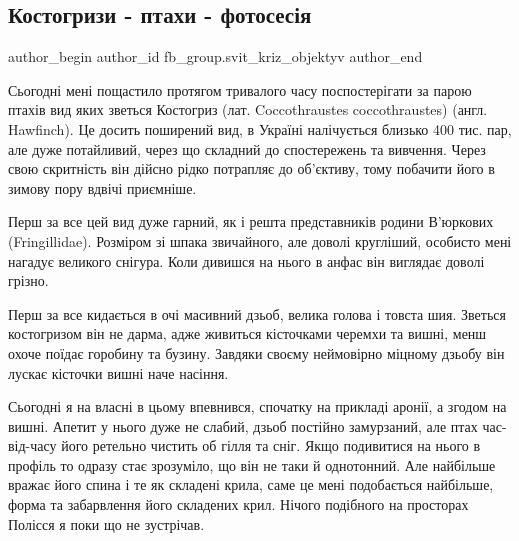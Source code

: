 
 
 
 
 
 
\subsection{Костогризи - птахи - фотосесія}
\label{sec:24_01_2022.fb.fb_group.svit_kriz_objektyv.1.kostogryz_fotosessia_ptahy}
 
\ifcmt
 author_begin
   author_id fb_group.svit_kriz_objektyv
 author_end
\fi

Сьогодні мені пощастило протягом тривалого часу поспостерігати за парою птахів
вид яких зветься Костогриз (лат. Coccothraustes coccothraustes) (англ.
Hawfinch). Це досить поширений вид, в Україні налічується близько 400 тис. пар,
але дуже потайливий, через що складний до спостережень та вивчення. Через свою
скритність він дійсно рідко потрапляє до об'єктиву, тому побачити його в зимову
пору вдвічі приємніше. 


Перш за все цей вид дуже гарний, як і решта
представників родини В'юркових (Fringillidae). Розміром зі шпака звичайного,
але доволі кругліший, особисто мені нагадує великого снігура. Коли дивишся на
нього в анфас він виглядає доволі грізно. 


Перш за все кидається в очі масивний
дзьоб, велика голова і товста шия. Зветься костогризом він не дарма, адже
живиться кісточками черемхи та вишні, менш охоче поїдає горобину та бузину.
Завдяки своєму неймовірно міцному дзьобу він лускає кісточки вишні наче
насіння. 


Сьогодні я на власні в цьому впевнився, спочатку на прикладі аронії, а
згодом на вишні. Апетит у нього дуже не слабий, дзьоб постійно замурзаний, але
птах час-від-часу його ретельно чистить об гілля та сніг. Якщо подивитися на
нього в профіль то одразу стає зрозуміло, що він не таки й однотонний. Але
найбільше вражає його спина і те як складені крила, саме це мені подобається
найбільше, форма та забарвлення його складених крил. Нічого подібного на
просторах Полісся я поки що не зустрічав. 

